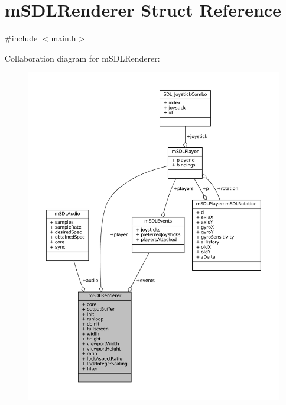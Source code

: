 \hypertarget{structm_s_d_l_renderer}{}\section{m\+S\+D\+L\+Renderer Struct Reference}
\label{structm_s_d_l_renderer}


{\ttfamily \#include $<$main.\+h$>$}



Collaboration diagram for m\+S\+D\+L\+Renderer\+:
\nopagebreak
\begin{figure}[H]
\begin{center}
\leavevmode
\includegraphics[width=350pt]{structm_s_d_l_renderer__coll__graph}
\end{center}
\end{figure}
